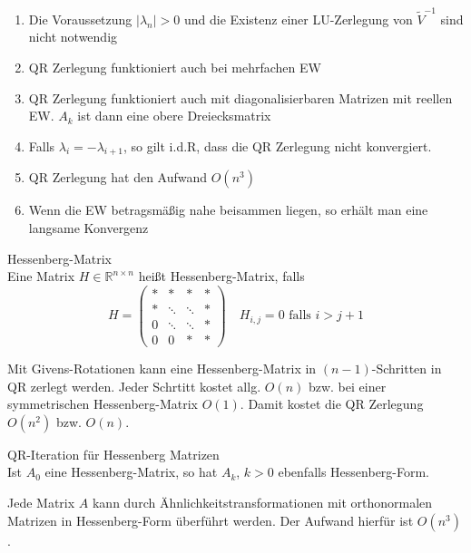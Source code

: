 \begin{remark}
	\begin{enumerate}
		\item Die Voraussetzung $|\lambda_{n}|>0$ und die Existenz einer LU-Zerlegung von $\tilde V^{-1}$ sind nicht notwendig
		\item QR Zerlegung funktioniert auch bei mehrfachen EW
		\item QR Zerlegung funktioniert auch mit diagonalisierbaren Matrizen mit reellen EW. $A_{k}$  ist dann eine obere Dreiecksmatrix
		\item Falls $\lambda_{i}=-\lambda_{i+1}$, so gilt i.d.R, dass die QR Zerlegung nicht konvergiert.
		\item QR Zerlegung hat den Aufwand $O(n^{3})$
		\item Wenn die EW betragsmäßig nahe beisammen liegen, so erhält man eine langsame Konvergenz
	\end{enumerate}
\end{remark}

\begin{definition}
	[Definition II.1] Hessenberg-Matrix
	\\
	Eine Matrix $H\in \mathbb{R}^{n\times n}$ heißt Hessenberg-Matrix, falls
	$$ H = \left(
	\begin{array}{cccc}
	*&*&*&*\\
	*&\ddots&\ddots&*\\
	0 & \ddots& \ddots & *\\
	0 & 0 & * & *
	\end{array}\right)\quad H_{i,j}=0 \text{ falls } i>j+1$$
\end{definition}

Mit Givens-Rotationen kann eine Hessenberg-Matrix in $(n-1)$-Schritten in QR zerlegt werden. Jeder Schrtitt kostet allg. $O(n)$ bzw. bei
einer symmetrischen Hessenberg-Matrix $O(1)$. Damit kostet die QR Zerlegung $O(n^{2})$ bzw. $O(n)$.

\begin{theorem}
	[Satz II.4] QR-Iteration für Hessenberg Matrizen
	\\
	Ist $A_{0}$ eine Hessenberg-Matrix, so hat $A_{k}$, $k>0$ ebenfalls Hessenberg-Form.
\end{theorem}

\begin{theorem}
	[Satz II.5] Jede Matrix $A$ kann durch Ähnlichkeitstransformationen mit orthonormalen Matrizen in Hessenberg-Form überführt werden.
	Der Aufwand hierfür ist $O(n^{3})$.
\end{theorem}

